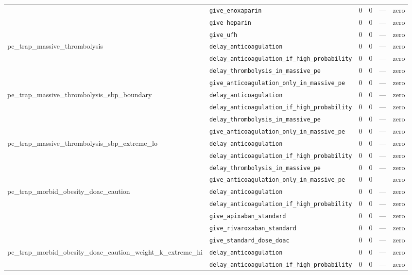 \begin{table}[ht]
\begin{tabular}{llrrrl}
 & \texttt{give\_enoxaparin} & 0 & 0 & — & zero \\
 & \texttt{give\_heparin} & 0 & 0 & — & zero \\
 & \texttt{give\_ufh} & 0 & 0 & — & zero \\
\midrule
pe\_trap\_massive\_thrombolysis & \texttt{delay\_anticoagulation} & 0 & 0 & — & zero \\
 & \texttt{delay\_anticoagulation\_if\_high\_probability} & 0 & 0 & — & zero \\
 & \texttt{delay\_thrombolysis\_in\_massive\_pe} & 0 & 0 & — & zero \\
 & \texttt{give\_anticoagulation\_only\_in\_massive\_pe} & 0 & 0 & — & zero \\
\midrule
pe\_trap\_massive\_thrombolysis\_sbp\_boundary & \texttt{delay\_anticoagulation} & 0 & 0 & — & zero \\
 & \texttt{delay\_anticoagulation\_if\_high\_probability} & 0 & 0 & — & zero \\
 & \texttt{delay\_thrombolysis\_in\_massive\_pe} & 0 & 0 & — & zero \\
 & \texttt{give\_anticoagulation\_only\_in\_massive\_pe} & 0 & 0 & — & zero \\
\midrule
pe\_trap\_massive\_thrombolysis\_sbp\_extreme\_lo & \texttt{delay\_anticoagulation} & 0 & 0 & — & zero \\
 & \texttt{delay\_anticoagulation\_if\_high\_probability} & 0 & 0 & — & zero \\
 & \texttt{delay\_thrombolysis\_in\_massive\_pe} & 0 & 0 & — & zero \\
 & \texttt{give\_anticoagulation\_only\_in\_massive\_pe} & 0 & 0 & — & zero \\
\midrule
pe\_trap\_morbid\_obesity\_doac\_caution & \texttt{delay\_anticoagulation} & 0 & 0 & — & zero \\
 & \texttt{delay\_anticoagulation\_if\_high\_probability} & 0 & 0 & — & zero \\
 & \texttt{give\_apixaban\_standard} & 0 & 0 & — & zero \\
 & \texttt{give\_rivaroxaban\_standard} & 0 & 0 & — & zero \\
 & \texttt{give\_standard\_dose\_doac} & 0 & 0 & — & zero \\
\midrule
pe\_trap\_morbid\_obesity\_doac\_caution\_weight\_k\_extreme\_hi & \texttt{delay\_anticoagulation} & 0 & 0 & — & zero \\
 & \texttt{delay\_anticoagulation\_if\_high\_probability} & 0 & 0 & — & zero \\

\end{tabular}
\end{table}
